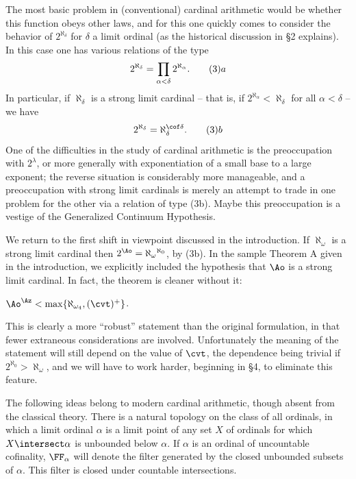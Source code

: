 The most basic problem in (conventional) cardinal 
arithmetic would be
whether this function obeys other laws, and for this one 
quickly comes
to consider the behavior of $2^{\aleph_\delta}$ for 
$\delta$ a limit
ordinal (as the historical discussion in \S2 explains).  
In this case
one has various relations of the type
$$2^{\aleph_\delta}=\prod_{\alpha<\delta} 
2^{\aleph_\alpha}.\tag3a$$
In particular, if $\aleph_\delta$ is a strong limit 
cardinal -- that
is, if $2^{\aleph_\alpha}<\aleph_\delta$ for all $\alpha 
<\delta$ --
we have
$$2^{\aleph_\delta}=\aleph_\delta^{\cof \delta}.\tag3b$$
One of the difficulties in the study of cardinal 
arithmetic is the
preoccupation with $2^\lambda$, or more generally with 
exponentiation
of a small base to a large exponent; the reverse situation 
is
considerably more manageable, and a preoccupation with 
strong limit
cardinals is merely an attempt to trade in one problem for 
the other
via a relation of type (3b).
 Maybe this preoccupation is a vestige
of the Generalized Continuum Hypothesis.
 
We return to the first shift in viewpoint discussed in the
introduction.  If $\aleph_\omega$ is a strong limit 
cardinal then
$2^{\Ao}=\aleph_\omega{}^{\aleph_0}$, by (3b).  In the 
sample
Theorem A given in the introduction, we explicitly 
included the
hypothesis that $\Ao$ is a strong limit cardinal. In fact, 
the
theorem is cleaner without it:
 
 $\Ao^\Az <\max 
\{\aleph_{\omega_4},(\cvt)^+\}$.
\endproclaim
 
This is clearly a more ``robust'' statement than the 
original
formulation, in that fewer extraneous considerations are 
involved.
Unfortunately the meaning of the statement will still depend
on the value of $\cvt$, the dependence being trivial if 
$2^{\aleph_0}>\aleph
_\omega$, and we will have to work harder, beginning in
\S4,  to eliminate this feature.
 
 
The following ideas belong to modern cardinal arithmetic, 
though
absent from the classical theory.  There is a natural 
topology on the
class of all ordinals, in which a limit ordinal $\alpha$ 
is a limit
point of any set $X$ of ordinals for which 
$X\intersect\alpha$ is
unbounded below $\alpha$.  If $\alpha$ is an ordinal of 
uncountable
cofinality, $\FF_\alpha$ will denote the filter generated 
by the
closed unbounded subsets of $\alpha$.  This filter is 
closed under
countable intersections.
 
